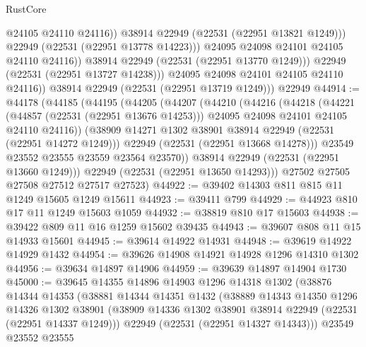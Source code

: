 \begin{lexlean}{RustCore}
\begin{coremodule}
                          @24105
                          @24110
                          @24116))
                      @38914
                      @22949
                      (@22531 (@22951 @13821 @1249)))
                    @22949
                    (@22531 (@22951 @13778 @14223)))
                  @24095
                  @24098
                  @24101
                  @24105
                  @24110
                  @24116))
              @38914
              @22949
              (@22531 (@22951 @13770 @1249)))
            @22949
            (@22531 (@22951 @13727 @14238)))
          @24095
          @24098
          @24101
          @24105
          @24110
          @24116))
      @38914
      @22949
      (@22531 (@22951 @13719 @1249)))
    @22949
@44914 := @44178
    (@44185
      (@44195
        (@44205
          (@44207
            (@44210
              (@44216
                (@44218
                  (@44221
                    (@44857 (@22531 (@22951 @13676 @14253)))
                    @24095
                    @24098
                    @24101
                    @24105
                    @24110
                    @24116))
                (@38909 @14271 @1302 @38901 @38914 @22949 (@22531 (@22951 @14272 @1249)))
                @22949
                (@22531 (@22951 @13668 @14278)))
              @23549
              @23552
              @23555
              @23559
              @23564
              @23570))
          @38914
          @22949
          (@22531 (@22951 @13660 @1249)))
        @22949
        (@22531 (@22951 @13650 @14293)))
      @27502
      @27505
      @27508
      @27512
      @27517
      @27523)
@44922 := @39402 @14303 @811 @815 @11 @1249 @15605 @1249 @15611
@44923 := @39411 @799
@44929 := @44923 @810 @17 @11 @1249 @15603 @1059
@44932 := @38819 @810 @17 @15603
@44938 := @39422 @809 @11 @16 @1259 @15602 @39435
@44943 := @39607 @808 @11 @15 @14933 @15601
@44945 := @39614 @14922 @14931
@44948 := @39619 @14922 @14929 @1432
@44954 := @39626 @14908 @14921 @14928 @1296 @14310 @1302
@44956 := @39634 @14897 @14906
@44959 := @39639 @14897 @14904 @1730
@45000 := @39645
    @14355
    @14896
    @14903
    @1296
    @14318
    @1302
    (@38876
      @14344
      @14353
      (@38881
        @14344
        @14351
        @1432
        (@38889
          @14343
          @14350
          @1296
          @14326
          @1302
          @38901
          (@38909 @14336 @1302 @38901 @38914 @22949 (@22531 (@22951 @14337 @1249)))
          @22949
          (@22531 (@22951 @14327 @14343)))
        @23549
        @23552
        @23555

\end{coremodule}
\end{lexlean}
